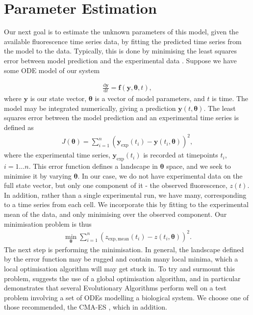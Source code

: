 \documentclass[10pt,journal]{./IEEE_latex_class/IEEEtran}
\begin{document}



\section{Parameter Estimation}
\label{Parameter Estimation}

Our next goal is to estimate the unknown parameters of this model, given the available fluorescence time series data, by fitting the predicted time series from the model to the data. Typically, this is done by minimising the least squares error between model prediction and the experimental data \cite{Brewer2008,Algorithms2003, Hu2015}. Suppose we have some ODE model of our system

\begin{align}
\frac{\mathrm{d}\mathbf{y}}{\mathrm{d}t} = \mathbf{f}(\mathbf{y},\boldsymbol{\theta},t),
\end{align}
where $\mathbf{y}$ is our state vector, $\boldsymbol{\theta}$ is a vector of model parameters, and $t$ is time. The model may be integrated numerically, giving a prediction $\mathbf{y}(t,\boldsymbol{\theta})$. The least squares error between the model prediction and an experimental time series is defined as
\begin{align}
J(\boldsymbol{\theta}) = \sum_{i =1}^{n} (\mathbf{y}_{\mathrm{exp}}(t_{i}) - \mathbf{y}(t_{i},\boldsymbol{\theta}))^2,
\end{align}
where the experimental time series, $\mathbf{y}_{\mathrm{exp}}(t_{i})$ is recorded at timepoints $t_{i}$, $i = 1 \hdots n$. This error function defines a landscape in $\boldsymbol{\theta}$ space, and we seek to minimise it by varying $\boldsymbol{\theta}$. In our case, we do not have experimental data on the full state vector, but only one component of it - the observed fluorescence, $z(t)$. In addition, rather than a single experimental run, we have many, corresponding to a time series from each cell. We incorporate this by fitting to the experimental mean of the data, and only minimising over the observed component. Our minimisation problem is thus
\begin{align}
\min_{\boldsymbol{\theta}} \sum_{i =1}^{n} (z_{\mathrm{exp, mean}}(t_{i}) - z(t_{i},\boldsymbol{\theta}))^2.
\label{eq:min}
\end{align}
The next step is performing the minimisation. In general, the landscape defined by the error function may be rugged and contain many local minima, which a local optimisation algorithm will may get stuck in. To try and surmount this problem, \cite{Algorithms2003} suggests the use of a global optimisation algorithm, and in particular demonstrates that several Evolutionary Algorithms perform well on a test problem involving a set of ODEs modelling a biological system. We choose one of those recommended, the CMA-ES \cite{Hansen2006,Hansen2011}, which in addition. 
\end{document}
